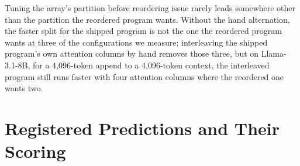 Tuning the array's partition before reordering issue rarely leads somewhere other than the partition the reordered program wants. Without the hand alternation, the faster split for the shipped program is not the one the reordered program wants at three of the configurations we measure; interleaving the shipped program's own attention columns by hand removes those three, but on Llama-3.1-8B, for a 4{,}096-token append to a 4{,}096-token context, the interleaved program still runs faster with four attention columns where the reordered one wants two.


\section{Registered Predictions and Their Scoring}
\label{subsec:tests}

